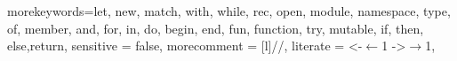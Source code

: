 \usepackage{listings}
\usepackage{color}
    {morekeywords={let, new, match, with, while, rec, open, module, namespace, type, of, member, and, for, in, do, begin, end, fun, function, try, mutable, if, then, else,return}, 
    sensitive = false, %
    morecomment = [l]{//},
    literate = %
        {<-}{$\leftarrow{}$}{1}
        {->}{$\rightarrow{}$}{1},
    }


